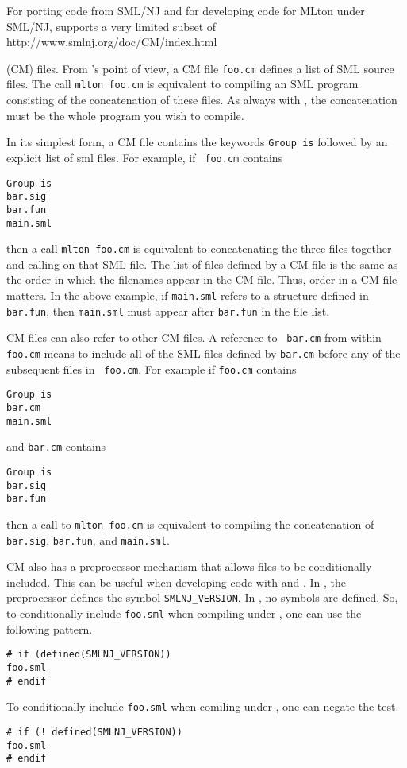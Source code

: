 %
For porting code from SML/NJ and for developing code for MLton under
SML/NJ, {\mlton} supports a very limited subset of
                  {http://www.smlnj.org/doc/CM/index.html}

(CM) files.  From {\mlton}'s point of view, a CM file {\tt foo.cm}
defines a list of SML source files.  The call {\tt mlton foo.cm} is
equivalent to compiling an SML program consisting of the concatenation
of these files.  As always with {\mlton}, the concatenation must be
the whole program you wish to compile.

In its simplest form, a CM file contains the keywords {\tt Group is}
followed by an explicit list of sml files.  For example, if {\tt
foo.cm} contains
\begin{verbatim}
Group is
bar.sig
bar.fun
main.sml
\end{verbatim}
then a call {\tt mlton foo.cm} is equivalent to concatenating the
three files together and calling {\mlton} on that SML file.  The list
of files defined by a CM file is the same as the order in which the
filenames appear in the CM file.  Thus, order in a CM file matters.
In the above example, if {\tt main.sml} refers to a structure defined
in {\tt bar.fun}, then {\tt main.sml} must appear after {\tt bar.fun}
in the file list.

CM files can also refer to other CM files.  A reference to {\tt
bar.cm} from within {\tt foo.cm} means to include all of the SML files
defined by {\tt bar.cm} before any of the subsequent files in {\tt
foo.cm}.  For example if {\tt foo.cm} contains
\begin{verbatim}
Group is
bar.cm
main.sml
\end{verbatim}
and {\tt bar.cm} contains
\begin{verbatim}
Group is
bar.sig
bar.fun
\end{verbatim}
then a call to {\tt mlton foo.cm} is equivalent to compiling the
concatenation of {\tt bar.sig}, {\tt bar.fun}, and {\tt main.sml}.

CM also has a preprocessor mechanism that allows files to be
conditionally included.  This can be useful when developing code with
{\smlnj} and {\mlton}.  In {\smlnj}, the preprocessor defines the
symbol {\tt SMLNJ\_VERSION}.  In {\mlton}, no symbols are defined.
So, to conditionally include {\tt foo.sml} when compiling under
{\smlnj}, one can use the following pattern.
\begin{verbatim}
# if (defined(SMLNJ_VERSION))
foo.sml
# endif
\end{verbatim}
To conditionally include {\tt foo.sml} when comiling under {\mlton}, one can
negate the test.
\begin{verbatim}
# if (! defined(SMLNJ_VERSION))
foo.sml
# endif
\end{verbatim}

